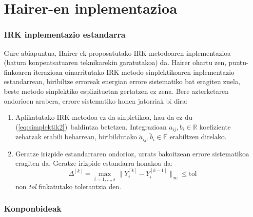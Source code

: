 \section{Hairer-en inplementazioa}

\subsubsection*{IRK inplementazio estandarra}

Gure abiapuntua, Hairer-ek \cite{Hairer2008} proposatutako IRK metodoaren inplementazioa (batura konpentsatuaren teknikarekin \cite{Higham2002} garatutakoa) da. Hairer ohartu zen, puntu-finkoaren iterazioan oinarritutako IRK metodo sinplektikoaren  inplementazio estandarrean, biribiltze erroreak energian errore sistematiko bat eragiten zuela, beste metodo sinplektiko esplizituetan gertatzen ez zena. Bere azterketaren ondorioen arabera, errore sistematiko honen jatorriak bi dira:

\begin{enumerate}
 \item Aplikatutako IRK metodoa ez da sinpletikoa, hau da ez du (\ref{eq:simplektik2})~baldintza betetzen. Integrazioan $a_{ij}, b_i \in \mathbb{R}$ koefiziente zehatzak erabili beharrean, biribildutako $\tilde a_{ij},\tilde b_i \in \mathbb{F}$ erabiltzen direlako. 
\item Geratze irizpide estandarraren ondorioz, urrats bakoitzean errore sistematikoa eragiten da. Geratze irizpide estandarra honakoa da: 
\begin{equation}
\Delta ^{[k]} = \max_{i=1,\dots,s}\|Y_i^{[k]}-Y_i^{[k-1]}\|_{\infty} \leqslant \text{tol}
\end{equation}
non \emph{tol} finkatutako tolerantzia den.

\end{enumerate}    

\subsubsection*{Konponbideak}

